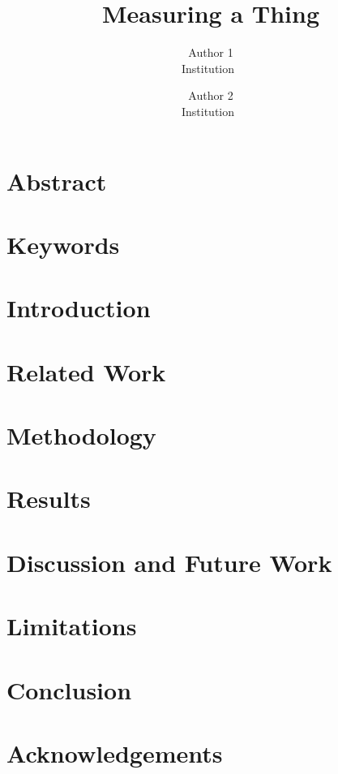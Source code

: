 \documentclass[letterpaper,twocolumn,10pt]{article}
\begin{document}

\date{}

\title{\Large \bf Measuring a Thing}

\author{
{\rm Author 1} \\
Institution~\cite{stephens_measuring_2021}
\and
{\rm Author 2} \\
Institution~\cite{tondello_gamification_2016}
} %

\maketitle

\section{Abstract}

\section{Keywords}

\section{Introduction}

\section{Related Work}

\section{Methodology}

\section{Results}

\section{Discussion and Future Work}

\section{Limitations}

\section{Conclusion}

\section{Acknowledgements}




\end{document}
